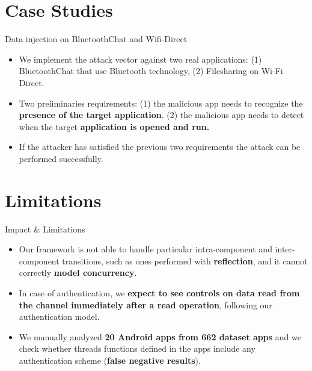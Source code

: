 \documentclass[10pt]{beamer}
\begin{document}
\section{Case Studies}
\begin{frame}[fragile]{Data injection on BluetoothChat and Wifi-Direct}

  \begin{itemize}

  \item We implement the attack vector against two real applications:
    (1) BluetoothChat that use Bluetooth technology, (2) Filesharing
    on Wi-Fi Direct.

  \item Two preliminaries requirements: (1) the malicious app needs to
    recognize the {\bf presence of the target application}. (2) the
    malicious app needs to detect when the target {\bf application is
      opened and run.}

  \item If the attacker has satisfied the previous two requirements
    the attack can be performed successfully.

  \end{itemize}
  
  
\end{frame}


\section{Limitations}
\begin{frame}[fragile]{Impact \& Limitations}

\begin{itemize}

\item Our framework is not able to handle particular intra-component
  and inter-component transitions, such as ones performed with {\bf
    reflection}, and it cannot correctly {\bf model concurrency}.

\item In case of authentication, we {\bf expect to see controls on
    data read from the channel immediately after a read operation},
  following our authentication model.

\item We manually analyzed {\bf 20 Android apps from 662 dataset apps}
  and we check whether threads functions defined in the apps include
  any authentication scheme ({\bf false negative results}).

\end{itemize}

\end{frame}
\end{document}
